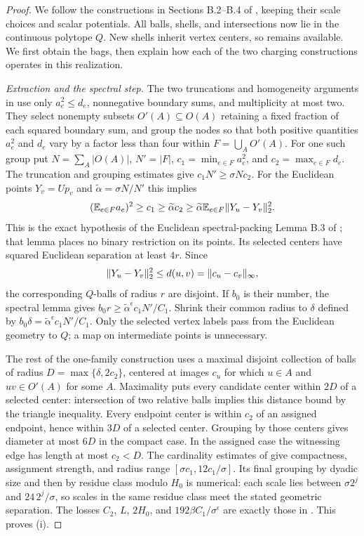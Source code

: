 \begin{proof}
We follow the constructions in Sections B.2--B.4 of
\cite{ThinTreesCompanion}, keeping their scale choices and scalar
potentials.  All balls, shells, and intersections now lie in the
continuous polytope $Q$.  New shells inherit vertex centers, so
 remains available.  We first obtain the bags,
then explain how each of the two charging constructions operates in
this realization.

\emph{Extraction and the spectral step.}
The two truncations and homogeneity arguments in
\cite[Section B.2.2]{ThinTreesCompanion} use only
$a_e^2\le d_e$, nonnegative boundary sums, and multiplicity at most
two.  They select nonempty subsets $O'(A)\subseteq O(A)$ retaining
a fixed fraction of each squared boundary sum, and group the nodes
so that both positive quantities $a_e^2$ and $d_e$ vary by a factor
less than four within $F=\bigcup_AO'(A)$.  For one such group put
$N=\sum_A|O(A)|$, $N'=|F|$,
$c_1=\min_{e\in F}a_e^2$, and $c_2=\max_{e\in F}d_e$.
The truncation and grouping estimates give $c_1N'\ge\sigma Nc_2$.
For the Euclidean points $Y_v=Up_v$ and
$\widetilde\alpha=\sigma N/N'$ this implies
\[
 (\mathbb E_{e\in F}a_e)^2\ge c_1
 \ge\widetilde\alpha c_2
 \ge\widetilde\alpha\mathbb E_{e\in F}\lVert Y_u-Y_v\rVert_2^2.
\]
This is the exact hypothesis of the Euclidean spectral-packing
Lemma B.3 of \cite{ThinTreesCompanion}; that lemma places no binary
restriction on its points.  Its selected centers have squared
Euclidean separation at least $4r$.  Since
\begin{equation}\label{tg:spectral-to-metric}
 \lVert Y_u-Y_v\rVert_2^2\le d(u,v)=\lVert c_u-c_v\rVert_\infty,
\end{equation}
the corresponding $Q$-balls of radius $r$ are disjoint.  If $b_0$
is their number, the spectral lemma gives
$b_0r\ge\widetilde\alpha^\epsilon c_1N'/C_1$.  Shrink their common
radius to $\delta$ defined by
$b_0\delta=\widetilde\alpha^\epsilon c_1N'/C_1$.
Only the selected vertex labels pass from the Euclidean geometry
to $Q$; a map on intermediate points is unnecessary.

The rest of the one-family construction uses a maximal disjoint
collection of balls of radius $D=\max\{\delta,2c_2\}$, centered at
images $c_u$ for which $u\in A$ and $uv\in O'(A)$ for some $A$.
Maximality puts every candidate center within $2D$ of a selected
center: intersection of two relative balls implies this distance
bound by the triangle inequality.  Every endpoint center is within
$c_2$ of an assigned endpoint, hence within $3D$ of a selected center.
Grouping by those centers gives diameter at most $6D$ in the compact
case.  In the assigned case the witnessing edge has length
at most $c_2<D$.  The cardinality estimates of
\cite[Lemma B.6]{ThinTreesCompanion} give compactness, assignment
strength, and radius range
$[\sigma c_1,12c_1/\sigma]$.  Its final grouping by dyadic size and
then by residue class modulo $H_0$ is numerical: each scale lies
between $\sigma2^j$ and $24\,2^j/\sigma$, so scales in the same
residue class meet the stated geometric separation.  The losses
$C_2$, $L$, $2H_0$, and $192\beta C_1/\sigma^\epsilon$ are exactly
those in .  This proves (i).


\end{proof}
